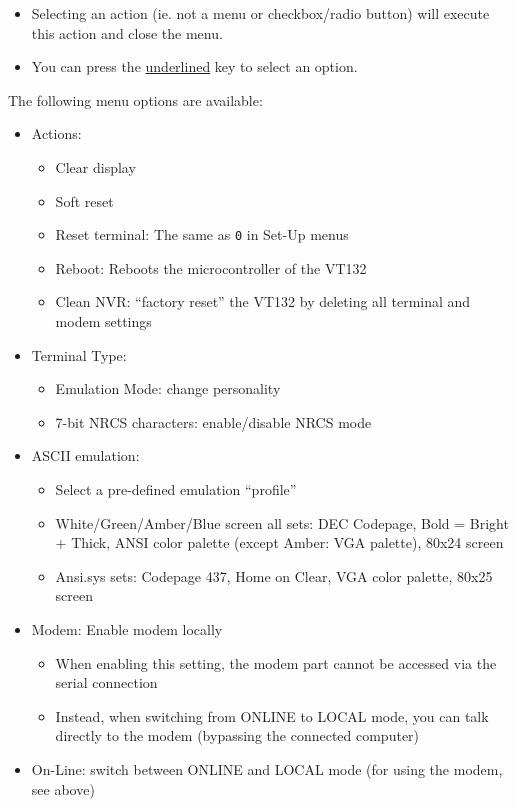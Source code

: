 \begin{itemize}
 \item Selecting an action (ie. not a menu or checkbox/radio button) will execute this action and close the menu.
 \item You can press the \underline{underlined} key to select an option.
\end{itemize}

The following menu options are available:

\begin{itemize}
 \item Actions:
 \begin{itemize}
  \item Clear display
  \item Soft reset
  \item Reset terminal: The same as \texttt{0} in Set-Up menus
  \item Reboot: Reboots the microcontroller of the VT132
  \item Clean NVR: ``factory reset'' the VT132 by deleting all terminal and modem settings
 \end{itemize}
 \item Terminal Type:
 \begin{itemize}
  \item Emulation Mode: change personality
  \item 7-bit NRCS characters: enable/disable NRCS mode
 \end{itemize}
 \item ASCII emulation:
 \begin{itemize}
  \item Select a pre-defined emulation ``profile''
  \item White/Green/Amber/Blue screen all sets: DEC Codepage, Bold = Bright + Thick, ANSI color palette (except Amber: VGA palette), 80x24 screen
  \item Ansi.sys sets: Codepage 437, Home on Clear, VGA color palette, 80x25 screen
 \end{itemize}
 \item Modem: Enable modem locally
 \begin{itemize}
  \item When enabling this setting, the modem part cannot be accessed via the serial connection
  \item Instead, when switching from ONLINE to LOCAL mode, you can talk directly to the modem (bypassing the connected computer)
 \end{itemize}
 \item On-Line: switch between ONLINE and LOCAL mode (for using the modem, see above)
\end{itemize}

